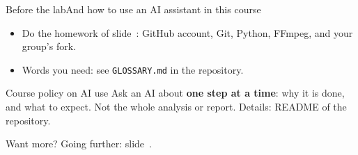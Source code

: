 %
\begin{frame}{Before the lab}{And how to use an AI assistant in this course}
  \small
  \begin{itemize}\setlength{\itemsep}{8pt}
    \item Do the \alert{homework} of slide~\pageref{frame:git-setup}: GitHub account, Git, Python, FFmpeg, and your group's fork.
    \item Words you need: see \alert{\texttt{GLOSSARY.md}} in the repository.
  \end{itemize}
  \vspace{8pt}
  \begin{alertblock}{\small Course policy on AI use}
    Ask an AI about \textbf{one step at a time}: why it is done, and what to expect. Not the whole analysis or report. Details: README of the repository.
  \end{alertblock}

  \vfill
  {\footnotesize Want more? Going further: slide~\pageref{app:going-further}.}
\end{frame}
